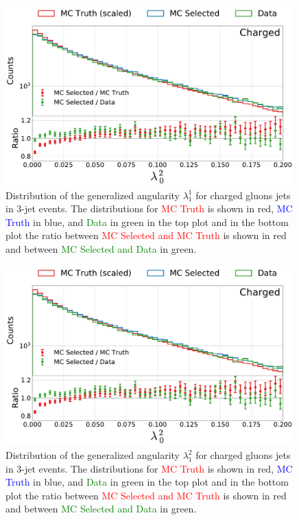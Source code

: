 \begin{figure}[h!]
  \centerfloat
  \includegraphics[width=0.99\textwidth, trim=0 0 0 0, clip, page=3]{figures/quarks/generalized_angularities_cha-down_sample=1.00-ML_vars=vertex-selection=b-ejet_min=4-n_iter_RS_lgb=99-n_iter_RS_xgb=9-cdot_cut=0.90-version=19.pdf}
  \caption[Generalized Angularities for Charged Gluons Jets: $\lambda_1^1$]
          {Distribution of the generalized angularity $\lambda_1^1$ for charged gluons jets in 3-jet events. The distributions for \textcolor{red}{MC Truth} is shown in red, \textcolor{blue}{MC Truth} in blue, and \textcolor{green}{Data} in green in the top plot and in the bottom plot the ratio between \textcolor{red}{MC Selected and MC Truth} is shown in red and between \textcolor{green}{MC Selected and Data} in green. }
  \label{fig:q:generalized_angularities_cha_lambda_1_1}
\end{figure}
\begin{figure}[h!]
  \centerfloat
  \includegraphics[width=0.99\textwidth, trim=0 0 0 0, clip, page=4]{figures/quarks/generalized_angularities_cha-down_sample=1.00-ML_vars=vertex-selection=b-ejet_min=4-n_iter_RS_lgb=99-n_iter_RS_xgb=9-cdot_cut=0.90-version=19.pdf}
  \caption[Generalized Angularities for Charged Gluons Jets: $\lambda_1^2$]
          {Distribution of the generalized angularity $\lambda_1^2$ for charged gluons jets in 3-jet events. The distributions for \textcolor{red}{MC Truth} is shown in red, \textcolor{blue}{MC Truth} in blue, and \textcolor{green}{Data} in green in the top plot and in the bottom plot the ratio between \textcolor{red}{MC Selected and MC Truth} is shown in red and between \textcolor{green}{MC Selected and Data} in green. }
  \label{fig:q:generalized_angularities_cha_lambda_1_2}
\end{figure}
